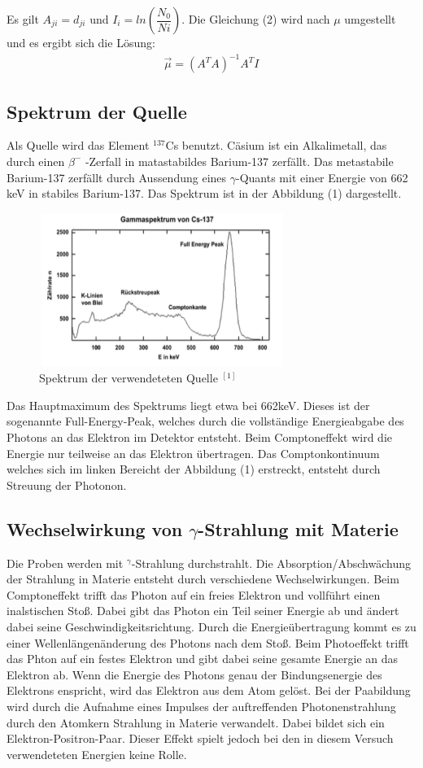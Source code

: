 \documentclass{article}
\begin{document}
Es gilt $A_{ji}=d_{ji}$ und $I_i=ln \left(\dfrac{N_0}{Ni} \right)$. Die Gleichung (2) wird nach $\mu$ umgestellt und es ergibt sich die Lösung: 
\begin{align}
\vec{\mu}= (A^T A)^{-1}  A^T I
\end{align}	
\subsection{Spektrum der Quelle}
Als Quelle wird das Element $^{137}$Cs benutzt. Cäsium ist ein Alkalimetall, das durch einen $\beta^-$ -Zerfall in matastabildes Barium-137 zerfällt. Das metastabile Barium-137 zerfällt durch Aussendung eines $\gamma$-Quants mit einer Energie von 662 keV in stabiles Barium-137. Das Spektrum ist in der Abbildung (1) dargestellt. 

 \begin{figure}[H]
	\centering
	\includegraphics[height=5cm, width=8cm]{hallo.png}
	\caption{ Spektrum der verwendeteten Quelle $^{[1]}$}   
	\label{fig: abb. 1}
\end{figure}
Das Hauptmaximum des Spektrums liegt etwa bei 662keV. Dieses ist der sogenannte Full-Energy-Peak, welches durch die vollständige Energieabgabe des Photons an das Elektron im Detektor entsteht. Beim Comptoneffekt wird die Energie nur teilweise an das Elektron übertragen. Das Comptonkontinuum welches sich im linken Bereicht der Abbildung (1) erstreckt, entsteht durch Streuung der Photonon.

\subsection{Wechselwirkung von $\gamma$-Strahlung mit Materie}

Die Proben werden mit $^\gamma$-Strahlung durchstrahlt. Die Absorption/Abschwächung der Strahlung in Materie entsteht durch verschiedene Wechselwirkungen. Beim Comptoneffekt trifft das Photon auf ein freies Elektron und vollführt einen inalstischen Stoß. Dabei gibt das Photon ein Teil seiner Energie ab und ändert dabei seine Geschwindigkeitsrichtung. Durch die Energieübertragung kommt es zu einer Wellenlängenänderung des Photons nach dem Stoß. Beim Photoeffekt trifft das Phton auf ein festes Elektron und gibt dabei seine gesamte Energie an das Elektron ab. Wenn die Energie des Photons genau der Bindungsenergie des Elektrons enspricht, wird das Elektron aus dem Atom gelöst. Bei der Paabildung wird durch die Aufnahme eines Impulses der auftreffenden Photonenstrahlung durch den Atomkern Strahlung in Materie verwandelt. Dabei bildet sich ein Elektron-Positron-Paar. Dieser Effekt spielt jedoch bei den in diesem Versuch verwendeteten Energien keine Rolle. 
\end{document}
